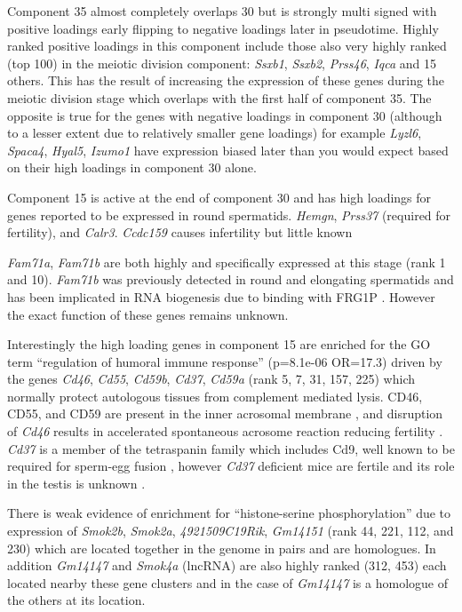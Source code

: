 Component 35 almost completely overlaps 30 but is strongly multi signed with positive loadings early flipping to negative loadings later in pseudotime. Highly ranked positive loadings in this component include those also very highly ranked (top 100) in the meiotic division component: \textit{Ssxb1}, \textit{Ssxb2}, \textit{Prss46}, \textit{Iqca} and 15 others. This has the result of increasing the expression of these genes during the meiotic division stage which overlaps with the first half of component 35. The opposite is true for the genes with negative loadings in component 30 (although to a lesser extent due to relatively smaller gene loadings) for example \textit{Lyzl6}, \textit{Spaca4}, \textit{Hyal5}, \textit{Izumo1} have expression biased later than you would expect based on their high loadings in component 30 alone.

Component 15 is active at the end of component 30 and has high loadings for genes reported to be expressed in round spermatids. \textit{Hemgn}, \textit{Prss37} (required for fertility), and \textit{Calr3}. \textit{Ccdc159} causes infertility but little known

\textit{Fam71a}, \textit{Fam71b} are both highly and specifically expressed at this stage (rank 1 and 10). \textit{Fam71b} was previously detected in round and elongating spermatids \parencite{Petit2015Combining} and has been implicated in RNA biogenesis due to binding with FRG1P \parencite{vanKoningsbruggen2007FRG1Pmediated}. However the exact function of these genes remains unknown.

Interestingly the high loading genes in component 15 are enriched for the GO term ``regulation of humoral immune response'' (p=8.1e-06 OR=17.3) driven by the genes \textit{Cd46}, \textit{Cd55}, \textit{Cd59b}, \textit{Cd37}, \textit{Cd59a} (rank 5, 7, 31, 157, 225) which normally protect autologous tissues from complement mediated lysis. CD46, CD55, and CD59 are present in the inner acrosomal membrane \parencite{Cummerson2006complement}, and disruption of \textit{Cd46} results in accelerated spontaneous acrosome reaction reducing fertility \parencite{Inoue2003Disruption}. \textit{Cd37} is a member of the tetraspanin family which includes Cd9, well known to be required for sperm-egg fusion \parencite{Kaji2000gamete, Naour2000Severely, Miyado2000Requirement}, however \textit{Cd37} deficient mice are fertile and its role in the testis is unknown \parencite{Knobeloch2000Targeted}.

There is weak evidence of enrichment for ``histone-serine phosphorylation'' due to expression of \textit{Smok2b}, \textit{Smok2a}, \textit{4921509C19Rik}, \textit{Gm14151} (rank 44, 221, 112, and 230) which are located together in the genome in pairs and are homologues. In addition \textit{Gm14147} and \textit{Smok4a} (lncRNA) are also highly ranked (312, 453) each located nearby these gene clusters and in the case of \textit{Gm14147} is a homologue of the others at its location.

